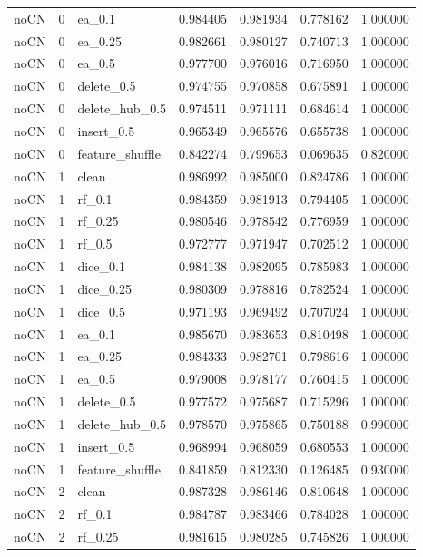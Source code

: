 \documentclass[UTF8,a4paper,11pt,fontset=fandol]{ctexart}
\begin{document}
{\begin{longtable}{lrlrrrr}
noCN & 0 & ea\_0.1 & 0.984405 & 0.981934 & 0.778162 & 1.000000 \\
noCN & 0 & ea\_0.25 & 0.982661 & 0.980127 & 0.740713 & 1.000000 \\
noCN & 0 & ea\_0.5 & 0.977700 & 0.976016 & 0.716950 & 1.000000 \\
noCN & 0 & delete\_0.5 & 0.974755 & 0.970858 & 0.675891 & 1.000000 \\
noCN & 0 & delete\_hub\_0.5 & 0.974511 & 0.971111 & 0.684614 & 1.000000 \\
noCN & 0 & insert\_0.5 & 0.965349 & 0.965576 & 0.655738 & 1.000000 \\
noCN & 0 & feature\_shuffle & 0.842274 & 0.799653 & 0.069635 & 0.820000 \\
noCN & 1 & clean & 0.986992 & 0.985000 & 0.824786 & 1.000000 \\
noCN & 1 & rf\_0.1 & 0.984359 & 0.981913 & 0.794405 & 1.000000 \\
noCN & 1 & rf\_0.25 & 0.980546 & 0.978542 & 0.776959 & 1.000000 \\
noCN & 1 & rf\_0.5 & 0.972777 & 0.971947 & 0.702512 & 1.000000 \\
noCN & 1 & dice\_0.1 & 0.984138 & 0.982095 & 0.785983 & 1.000000 \\
noCN & 1 & dice\_0.25 & 0.980309 & 0.978816 & 0.782524 & 1.000000 \\
noCN & 1 & dice\_0.5 & 0.971193 & 0.969492 & 0.707024 & 1.000000 \\
noCN & 1 & ea\_0.1 & 0.985670 & 0.983653 & 0.810498 & 1.000000 \\
noCN & 1 & ea\_0.25 & 0.984333 & 0.982701 & 0.798616 & 1.000000 \\
noCN & 1 & ea\_0.5 & 0.979008 & 0.978177 & 0.760415 & 1.000000 \\
noCN & 1 & delete\_0.5 & 0.977572 & 0.975687 & 0.715296 & 1.000000 \\
noCN & 1 & delete\_hub\_0.5 & 0.978570 & 0.975865 & 0.750188 & 0.990000 \\
noCN & 1 & insert\_0.5 & 0.968994 & 0.968059 & 0.680553 & 1.000000 \\
noCN & 1 & feature\_shuffle & 0.841859 & 0.812330 & 0.126485 & 0.930000 \\
noCN & 2 & clean & 0.987328 & 0.986146 & 0.810648 & 1.000000 \\
noCN & 2 & rf\_0.1 & 0.984787 & 0.983466 & 0.784028 & 1.000000 \\
noCN & 2 & rf\_0.25 & 0.981615 & 0.980285 & 0.745826 & 1.000000 \\

\end{longtable}}
\end{document}
